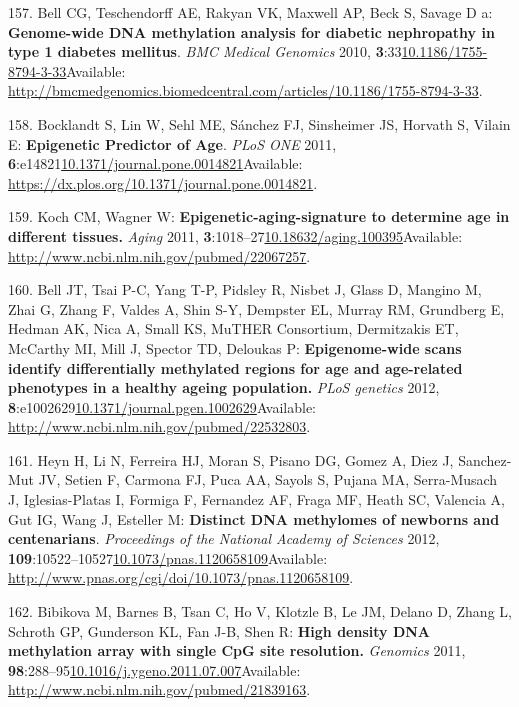 \documentclass[
]{book}
\begin{document}
\leavevmode\hypertarget{ref-Bell2010}{}%
157. Bell CG, Teschendorff AE, Rakyan VK, Maxwell AP, Beck S, Savage D a: \textbf{Genome-wide DNA methylation analysis for diabetic nephropathy in type 1 diabetes mellitus}. \emph{BMC Medical Genomics} 2010, \textbf{3}:33\href{https://doi.org/10.1186/1755-8794-3-33}{10.1186/1755-8794-3-33}Available: \url{http://bmcmedgenomics.biomedcentral.com/articles/10.1186/1755-8794-3-33}.

\leavevmode\hypertarget{ref-Bocklandt2011}{}%
158. Bocklandt S, Lin W, Sehl ME, Sánchez FJ, Sinsheimer JS, Horvath S, Vilain E: \textbf{Epigenetic Predictor of Age}. \emph{PLoS ONE} 2011, \textbf{6}:e14821\href{https://doi.org/10.1371/journal.pone.0014821}{10.1371/journal.pone.0014821}Available: \url{https://dx.plos.org/10.1371/journal.pone.0014821}.

\leavevmode\hypertarget{ref-Koch2011}{}%
159. Koch CM, Wagner W: \textbf{Epigenetic-aging-signature to determine age in different tissues.} \emph{Aging} 2011, \textbf{3}:1018--27\href{https://doi.org/10.18632/aging.100395}{10.18632/aging.100395}Available: \url{http://www.ncbi.nlm.nih.gov/pubmed/22067257}.

\leavevmode\hypertarget{ref-Bell2012}{}%
160. Bell JT, Tsai P-C, Yang T-P, Pidsley R, Nisbet J, Glass D, Mangino M, Zhai G, Zhang F, Valdes A, Shin S-Y, Dempster EL, Murray RM, Grundberg E, Hedman AK, Nica A, Small KS, MuTHER Consortium, Dermitzakis ET, McCarthy MI, Mill J, Spector TD, Deloukas P: \textbf{Epigenome-wide scans identify differentially methylated regions for age and age-related phenotypes in a healthy ageing population.} \emph{PLoS genetics} 2012, \textbf{8}:e1002629\href{https://doi.org/10.1371/journal.pgen.1002629}{10.1371/journal.pgen.1002629}Available: \url{http://www.ncbi.nlm.nih.gov/pubmed/22532803}.

\leavevmode\hypertarget{ref-Heyn2012}{}%
161. Heyn H, Li N, Ferreira HJ, Moran S, Pisano DG, Gomez A, Diez J, Sanchez-Mut JV, Setien F, Carmona FJ, Puca AA, Sayols S, Pujana MA, Serra-Musach J, Iglesias-Platas I, Formiga F, Fernandez AF, Fraga MF, Heath SC, Valencia A, Gut IG, Wang J, Esteller M: \textbf{Distinct DNA methylomes of newborns and centenarians}. \emph{Proceedings of the National Academy of Sciences} 2012, \textbf{109}:10522--10527\href{https://doi.org/10.1073/pnas.1120658109}{10.1073/pnas.1120658109}Available: \url{http://www.pnas.org/cgi/doi/10.1073/pnas.1120658109}.

\leavevmode\hypertarget{ref-Bibikova2011}{}%
162. Bibikova M, Barnes B, Tsan C, Ho V, Klotzle B, Le JM, Delano D, Zhang L, Schroth GP, Gunderson KL, Fan J-B, Shen R: \textbf{High density DNA methylation array with single CpG site resolution.} \emph{Genomics} 2011, \textbf{98}:288--95\href{https://doi.org/10.1016/j.ygeno.2011.07.007}{10.1016/j.ygeno.2011.07.007}Available: \url{http://www.ncbi.nlm.nih.gov/pubmed/21839163}.
\end{document}

